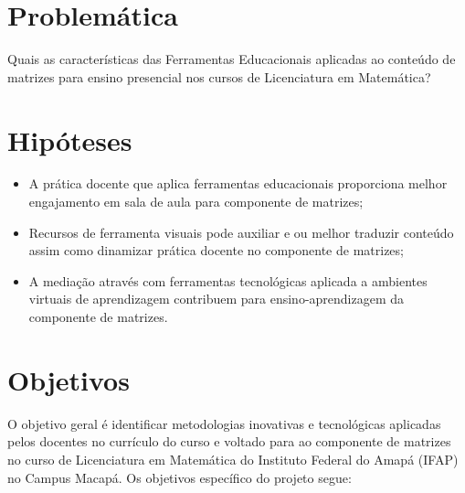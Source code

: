 

\section{Problemática}

Quais as características das Ferramentas Educacionais aplicadas ao conteúdo de matrizes para ensino presencial nos cursos de Licenciatura em Matemática?




\section{Hipóteses}
\label{sec:hipoteses}

\begin{itemize}
    \item A prática docente que aplica ferramentas educacionais proporciona melhor engajamento em sala de aula para componente de matrizes;
    \item Recursos de ferramenta visuais pode auxiliar e ou melhor traduzir conteúdo assim como dinamizar prática docente no componente de matrizes;
    \item A mediação através com ferramentas tecnológicas aplicada a ambientes virtuais de aprendizagem contribuem para ensino-aprendizagem da componente de matrizes.
\end{itemize}



\section{Objetivos}
\label{objetivos}


O objetivo geral é identificar metodologias inovativas e tecnológicas aplicadas pelos docentes no currículo do curso e voltado para ao componente de matrizes no curso de Licenciatura em Matemática do Instituto Federal do Amapá (IFAP) no Campus Macapá. Os objetivos específico do projeto segue:

